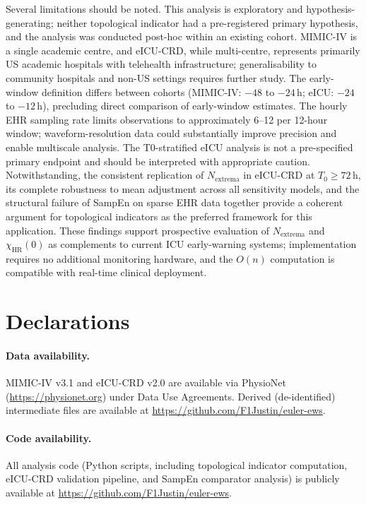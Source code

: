 \documentclass[12pt,a4paper]{article}
\begin{document}
Several limitations should be noted.
This analysis is exploratory and hypothesis-generating; neither topological
indicator had a pre-registered primary hypothesis, and the analysis was
conducted post-hoc within an existing cohort.
MIMIC-IV is a single academic centre, and eICU-CRD, while multi-centre,
represents primarily US academic hospitals with telehealth infrastructure;
generalisability to community hospitals and non-US settings requires further
study.
The early-window definition differs between cohorts (MIMIC-IV:
$-48$ to $-24$\,h; eICU: $-24$ to $-12$\,h), precluding direct comparison
of early-window estimates.
The hourly EHR sampling rate limits observations to approximately 6--12
per 12-hour window; waveform-resolution data could substantially improve
precision and enable multiscale analysis.
The T0-stratified eICU analysis is not a pre-specified primary endpoint
and should be interpreted with appropriate caution.
Notwithstanding, the consistent replication of $N_{\text{extrema}}$ in
eICU-CRD at $T_0\geq 72$\,h, its complete robustness to mean adjustment
across all sensitivity models, and the structural failure of SampEn on
sparse EHR data together provide a coherent argument for topological
indicators as the preferred framework for this application.
These findings support prospective evaluation of $N_{\text{extrema}}$ and
$\chi_{\text{HR}}(0)$ as complements to current ICU early-warning systems;
implementation requires no additional monitoring hardware, and the
$O(n)$ computation is compatible with real-time clinical deployment.

\section*{Declarations}

\paragraph{Data availability.}
MIMIC-IV v3.1 and eICU-CRD v2.0 are available via PhysioNet
(\url{https://physionet.org}) under Data Use Agreements.
Derived (de-identified) intermediate files are available at
\url{https://github.com/F1Justin/euler-ews}.

\paragraph{Code availability.}
All analysis code (Python scripts, including topological indicator
computation, eICU-CRD validation pipeline, and SampEn comparator
analysis) is publicly available at
\url{https://github.com/F1Justin/euler-ews}.
\end{document}
